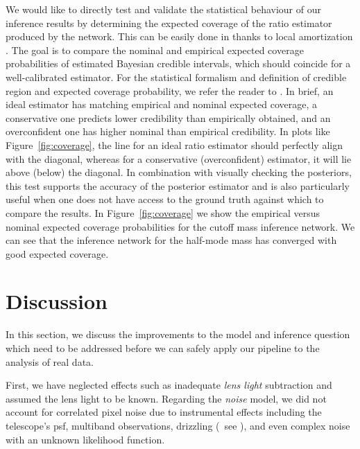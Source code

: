 We would like to directly test and validate the statistical behaviour of our inference results by determining the expected coverage of the ratio estimator produced by the network. This can be easily done in \swyft thanks to local amortization \citep{Miller:2022shs}.
The goal is to compare the nominal and empirical expected coverage probabilities of estimated Bayesian credible intervals, which should coincide for a well-calibrated estimator. For the statistical formalism and definition of credible region and expected coverage probability, we refer the reader to \cite{Hermans:2021rqv}. In brief, an ideal estimator has matching empirical and nominal expected coverage, a conservative one predicts lower credibility than empirically obtained, and an overconfident one has higher nominal than empirical credibility. In plots like Figure~\ref{fig:coverage}, the line for an ideal ratio estimator should perfectly align with the diagonal, whereas for a conservative (overconfident) estimator, it will lie above (below) the diagonal.
In combination with visually checking the posteriors, this test supports the accuracy of the posterior estimator and is also particularly useful when one does not have access to the ground truth against which to compare the results.
In Figure~\ref{fig:coverage} we show the empirical versus nominal expected coverage probabilities for the cutoff mass inference network. We can see that the inference network for the half-mode mass has converged with good expected coverage. 


\section{Discussion}\label{sec:sl-discussion}

In this section, we discuss the improvements to the model and inference question which need to be addressed before we can safely apply our pipeline to the analysis of real data. 

First, we have neglected effects such as inadequate \emph{lens light} subtraction and assumed the lens light to be known. Regarding the \emph{noise} model, we did not account for correlated pixel noise due to instrumental effects including the telescope's \gls*{psf}, multiband observations, drizzling  (\eg~see \cite{Wagner-Carena:2022mrn}), and even complex noise with an unknown likelihood function.


